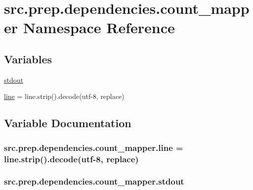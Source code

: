 \hypertarget{namespacesrc_1_1prep_1_1dependencies_1_1count__mapper}{}\section{src.\+prep.\+dependencies.\+count\+\_\+mapper Namespace Reference}
\label{namespacesrc_1_1prep_1_1dependencies_1_1count__mapper}
\subsection*{Variables}
\begin{DoxyCompactItemize}
\item 
\hyperlink{namespacesrc_1_1prep_1_1dependencies_1_1count__mapper_aa972bb045e740fc143f3140143a9a19f}{stdout}
\item 
\hyperlink{namespacesrc_1_1prep_1_1dependencies_1_1count__mapper_aff0f8d7765fbdf4da7fcc0f4bd248a7e}{line} = line.\+strip().decode(\textquotesingle{}utf-\/8\textquotesingle{}, \textquotesingle{}replace\textquotesingle{})
\end{DoxyCompactItemize}


\subsection{Variable Documentation}
\subsubsection[{\texorpdfstring{line}{line}}]{\setlength{\rightskip}{0pt plus 5cm}src.\+prep.\+dependencies.\+count\+\_\+mapper.\+line = line.\+strip().decode(\textquotesingle{}utf-\/8\textquotesingle{}, \textquotesingle{}replace\textquotesingle{})}\hypertarget{namespacesrc_1_1prep_1_1dependencies_1_1count__mapper_aff0f8d7765fbdf4da7fcc0f4bd248a7e}{}\label{namespacesrc_1_1prep_1_1dependencies_1_1count__mapper_aff0f8d7765fbdf4da7fcc0f4bd248a7e}
\subsubsection[{\texorpdfstring{stdout}{stdout}}]{\setlength{\rightskip}{0pt plus 5cm}src.\+prep.\+dependencies.\+count\+\_\+mapper.\+stdout}\hypertarget{namespacesrc_1_1prep_1_1dependencies_1_1count__mapper_aa972bb045e740fc143f3140143a9a19f}{}\label{namespacesrc_1_1prep_1_1dependencies_1_1count__mapper_aa972bb045e740fc143f3140143a9a19f}
